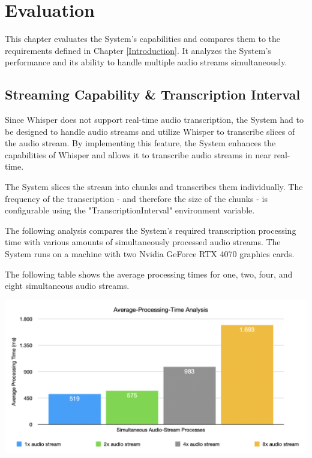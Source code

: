 \chapter{Evaluation}

\label{Evaluation}

This chapter evaluates the System's capabilities and compares them to the requirements defined in Chapter 
\ref{Introduction}. It analyzes the System's performance and its ability to handle multiple audio streams 
simultaneously.


\section{Streaming Capability \& Transcription Interval}

Since Whisper does not support real-time audio transcription, the System had to be designed to handle audio streams 
and utilize Whisper to transcribe slices of the audio stream. By implementing this feature, the System 
enhances the capabilities of Whisper and allows it to transcribe audio streams in near real-time.

The System slices the stream into chunks and transcribes them individually. The frequency of the transcription - 
and therefore the size of the chunks - is configurable using the "TranscriptionInterval" environment variable.

The following analysis compares the System's required transcription processing time with various amounts of 
simultaneously processed audio streams. The System runs on a machine with two Nvidia GeForce RTX 4070 graphics cards. 

The following table shows the average processing times for one, two, four, and eight simultaneous audio streams.

\includegraphics[scale=0.45]{Figures/avg-processing-times.png}


